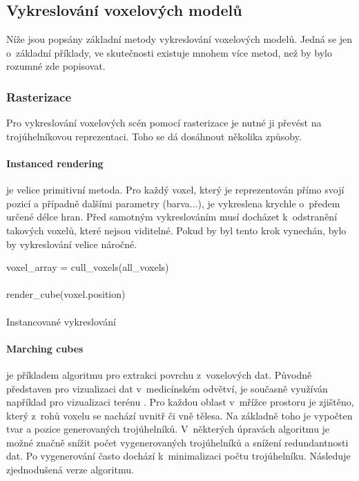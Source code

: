 \subsection{Vykreslování voxelových modelů}
Níže jsou popsány základní metody vykreslování voxelových modelů. Jedná se jen o~základní příklady, ve skutečnosti existuje mnohem více metod, než by bylo rozumné zde popisovat.

\subsubsection{Rasterizace}
Pro vykreslování voxelových scén pomocí rasterizace je nutné ji převést na trojúhelníkovou reprezentaci. Toho se dá dosáhnout několika způsoby.

\paragraph{Instanced rendering} je velice primitivní metoda. Pro každý voxel, který je reprezentován přímo svojí pozicí a případně dalšími parametry (barva...), je vykreslena krychle o~předem určené délce hran. Před samotným vykreslováním musí docházet k~odstranění takových voxelů, které nejsou viditelné. Pokud by byl tento krok vynechán, bylo by vykreslování velice náročné. \cite{nousiainen_2019}

\begin{center}
	\begin{czechalgorithm}[H] \label{alg:instanced_cube}
		voxel\_array = cull\_voxels(all\_voxels)\\
		 {\\
			render\_cube(voxel.position)\\
		}\\
		\caption{Instancované vykreslování}
	\end{czechalgorithm}
\end{center}

\paragraph{Marching cubes \cite{marching_cubes}} je příkladem algoritmu pro extrakci povrchu z~voxelových dat. Původně představen pro vizualizaci dat v~medicínském odvětví, je současně využíván například pro vizualizaci terénu \cite{nguyen_2008}. Pro každou oblast v~mřížce prostoru je zjištěno, který z~rohů voxelu se nachází uvnitř či vně tělesa. Na základně toho je vypočten tvar a pozice generovaných trojúhelníků. V~některých úpravách algoritmu je možné značně snížit počet vygenerovaných trojúhelníků a snížení redundantnosti dat. Po vygenerování často dochází k~minimalizaci počtu trojúhelníku. Následuje zjednodušená verze algoritmu.

